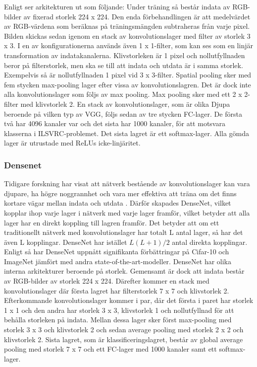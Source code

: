 \documentclass[]{kththesis}
\begin{document}
Enligt \cite{simonyan2014very} ser arkitekturen ut som följande: Under träning så består indata av RGB-bilder av fixerad storlek 224 x 224. Den enda förbehandlingen är att medelvärdet av RGB-värdena som beräknas på träningsmängden subtraheras från varje pixel. Bilden skickas sedan igenom en stack av konvolutionslager med filter av storlek 3 x 3. I en av konfigurationerna används även 1 x 1-filter, som kan ses som en linjär transformation av indatakanalerna. Klivstorleken är 1 pixel och nollutfyllnaden beror på filterstorlek, men ska se till att indata och utdata är i samma storlek. Exempelvis så är nollutfyllnaden 1 pixel vid 3 x 3-filter. Spatial pooling sker med fem stycken max-pooling lager efter vissa av konvolutionslagren. Det är dock inte alla konvolutionslager som följs av max pooling. Max pooling sker med ett 2 x 2-filter med klivstorlek 2. En stack av konvolutionslager, som är olika Djupa beroende på vilken typ av VGG, följs sedan av tre stycken FC-lager. De första två har 4096 kanaler var och det sista har 1000 kanaler, för att motsvara klasserna i ILSVRC-problemet. Det sista lagret är ett softmax-lager. Alla gömda lager är utrustade med ReLUs icke-linjäritet. 

\subsubsection{Densenet}
Tidigare forskning har visat att nätverk bestående av konvolutionslager kan vara djupare, ha högre noggrannhet och vara mer effektiva att träna om det finns kortare vägar mellan indata och utdata \parencite{huang2017densely}. Därför skapades DenseNet, vilket kopplar ihop varje lager i nätverk med varje lager framför, vilket betyder att alla lager har en direkt koppling till lagren framför. Det betyder att om ett traditionellt nätverk med konvolutionslager har totalt L antal lager, så har det även L kopplingar. DenseNet har istället \begin{math} L(L+1)/2 \end{math} antal direkta kopplingar. Enligt \textcite{huang2017densely} så har DenseNet uppnått signifikanta förbättringar på Cifar-10 och ImageNet jämfört med andra state-of-the-art-modeller. DenseNet har olika interna arkitekturer beroende på storlek. Gemensamt är dock att indata består av RGB-bilder av storlek 224 x 224. Därefter kommer en stack med konvolutionslager där första lagret har filterstorlek 7 x 7 och klivstorlek 2. Efterkommande konvolutionslager kommer i par, där det första i paret har storlek 1 x 1 och den andra har storlek 3 x 3, klivstorlek 1 och nollutfyllnad för att behålla storleken på indata. Mellan dessa lager sker först max-pooling med storlek 3 x 3 och klivstorlek 2 och sedan average pooling med storlek 2 x 2 och klivstorlek 2. Sista lagret, som är klassificeringslagret, består av global average pooling med storlek 7 x 7 och ett FC-lager med 1000 kanaler samt ett softmax-lager.
\end{document}
